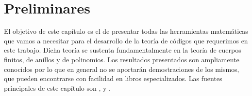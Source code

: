 \chapter{Preliminares}
\label{ch:preliminares}

El objetivo de este capítulo es el de presentar todas las herramientas matemáticas que vamos a necesitar para el desarrollo de la teoría de códigos que requerimos en este trabajo.
Dicha teoría se sustenta fundamentalmente en la teoría de cuerpos finitos, de anillos y de polinomios.
Los resultados presentados son ampliamente conocidos por lo que en general no se aportarán demostraciones de los mismos, que pueden encontrarse con facilidad en libros especializados.
Las fuentes principales de este capítulo son \parencite[cap. 3 y 6]{cohn_algebra_1982}, \parencite[cap. 3]{cohn_algebra_1989} y \parencite[cap. 2]{lidl_introduction_1986}.






